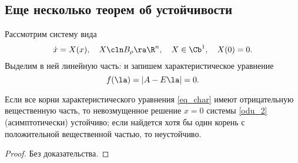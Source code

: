 \documentclass[a4paper,12pt]{article}
\newcommand{\eql}[2]{\begin{equation}\label{#2}#1\end{equation}}
\begin{document}
\subsection{Еще несколько теорем об устойчивости}

Рассмотрим систему вида
\eql{\dot{x}=X(x),\quad X\cln B_{\rho}\ra\R^n,\quad X \in \Cb^1,\quad X(0)=0.}{odu_2} Выделим
в ней линейную часть:
 и запишем
характеристическое уравнение \eql{f(\la)=|A-E\la|=0.}{eq_char}
\begin{theorem}[А.\,М.\,Ляпунов]
\label{th_lyap_1}
Если все корни характеристического уравнения \eqref{eq_char} имеют отрицательную вещественную
часть, то невозмущенное решение $x=0$ системы \eqref{odu_2} (асимптотически) устойчиво; если
найдется хотя бы один корень с положительной вещественной частью, то неустойчиво.
\end{theorem}
\begin{proof}
Без доказательства.
\end{proof}
\end{document}
